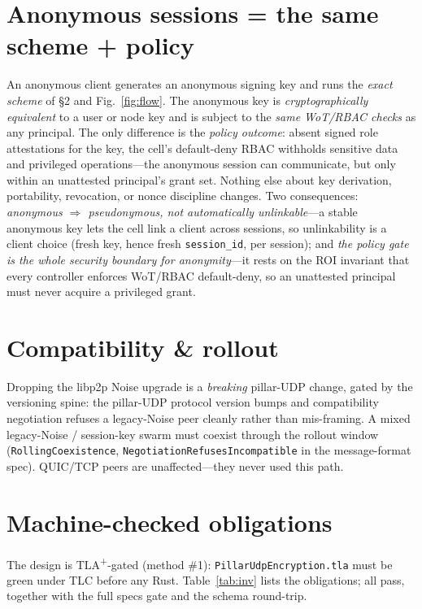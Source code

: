 \documentclass[10pt,twocolumn]{article}
\newcommand{\code}[1]{\texttt{\small #1}}
\begin{document}
\section{Anonymous sessions {=} the same scheme {+} policy}
\label{sec:anon}
An anonymous client generates an anonymous signing key and runs the \emph{exact
scheme} of \S2 and Fig.~\ref{fig:flow}. The anonymous key is \emph{cryptographically
equivalent} to a user or node key and is subject to the \emph{same WoT/RBAC checks}
as any principal. The only difference is the \emph{policy outcome}: absent signed
role attestations for the key, the cell's default-deny RBAC withholds sensitive
data and privileged operations---the anonymous session can communicate, but only
within an unattested principal's grant set. Nothing else about key derivation,
portability, revocation, or nonce discipline changes. Two consequences:
\emph{anonymous $\Rightarrow$ pseudonymous, not automatically unlinkable}---a
stable anonymous key lets the cell link a client across sessions, so unlinkability
is a client choice (fresh key, hence fresh \code{session\_id}, per session); and
\emph{the policy gate is the whole security boundary for anonymity}---it rests on
the ROI invariant that every controller enforces WoT/RBAC default-deny, so an
unattested principal must never acquire a privileged grant.

\section{Compatibility \& rollout}
Dropping the libp2p Noise upgrade is a \emph{breaking} pillar-UDP change, gated by
the versioning spine: the pillar-UDP protocol version bumps and compatibility
negotiation refuses a legacy-Noise peer cleanly rather than mis-framing. A mixed
legacy-Noise / session-key swarm must coexist through the rollout window
(\code{RollingCoexistence}, \code{NegotiationRefusesIncompatible} in the
message-format spec). QUIC/TCP peers are unaffected---they never used this path.

\section{Machine-checked obligations}
The design is TLA\textsuperscript{+}-gated (method \#1): \code{PillarUdpEncryption.tla}
must be green under TLC before any Rust. Table~\ref{tab:inv} lists the obligations;
all pass, together with the full specs gate and the schema round-trip.
\end{document}

